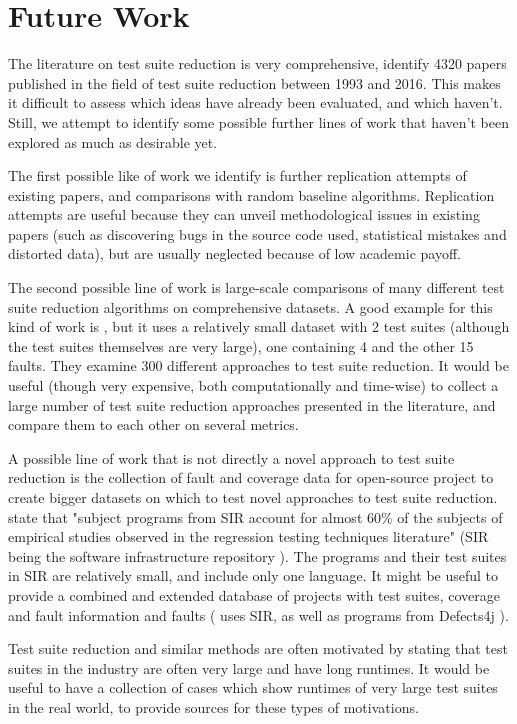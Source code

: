 
\chapter{Future Work}\label{chapter:futurework}

The literature on test suite reduction is very comprehensive,
\cite{khan2018systematic} identify 4320 papers published in the field
of test suite reduction between 1993 and 2016. This makes it difficult
to assess which ideas have already been evaluated, and which haven't.
Still, we attempt to identify some possible further lines of work that
haven't been explored as much as desirable yet.

The first possible like of work we identify is further replication
attempts of existing papers, and comparisons with random baseline
algorithms.  Replication attempts are useful because they can unveil
methodological issues in existing papers (such as discovering bugs in
the source code used, statistical mistakes and distorted data), but are
usually neglected because of low academic payoff. %

The second possible line of work is large-scale comparisons of many
different test suite reduction algorithms on comprehensive datasets.
A good example for this kind of work is \cite{hemmati2010achieving},
but it uses a relatively small dataset with 2 test suites (although
the test suites themselves are very large), one containing 4 and
the other 15 faults. They examine 300 different approaches to test
suite reduction. It would be useful (though very expensive, both
computationally and time-wise) to collect a large number of test suite
reduction approaches presented in the literature, and compare them to
each other on several metrics.

A possible line of work that is not directly a novel approach to
test suite reduction is the collection of fault and coverage data for
open-source project to create bigger datasets on which to test novel
approaches to test suite reduction. \cite{yoo2012regression}
state that "subject programs from SIR account for almost 60\% of
the subjects of empirical studies observed in the regression testing
techniques literature" (SIR being the software infrastructure repository
\cite{dosupporting2005}). The programs and their test suites in SIR are
relatively small, and include only one language. It might be useful to
provide a combined and extended database of projects with test suites,
coverage and fault information and faults (\cite{cruciani2019scalable}
uses SIR, as well as programs from Defects4j \cite{just2014defects}).

Test suite reduction and similar methods are often motivated by stating
that test suites in the industry are often very large and have long
runtimes. It would be useful to have a collection of cases which show
runtimes of very large test suites in the real world, to provide sources
for these types of motivations.
